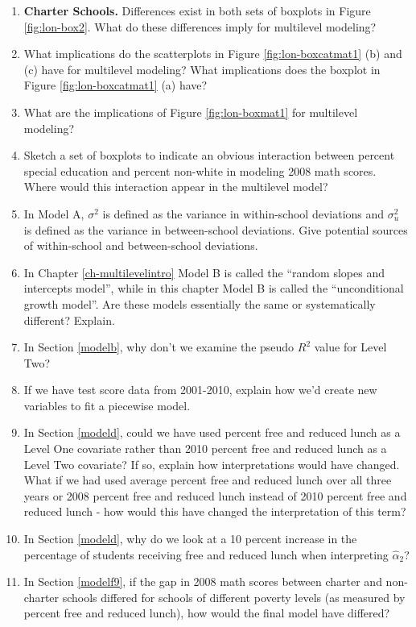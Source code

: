 \documentclass[
]{krantz}
\begin{document}
\begin{enumerate}
\def\labelenumi{\arabic{enumi}.}
\setcounter{enumi}{5}
\item
  \textbf{Charter Schools.} Differences exist in both sets of boxplots in Figure \ref{fig:lon-box2}. What do these differences imply for multilevel modeling?
\item
  What implications do the scatterplots in Figure \ref{fig:lon-boxcatmat1} (b) and (c) have for multilevel modeling? What implications does the boxplot in Figure \ref{fig:lon-boxcatmat1} (a) have?
\item
  What are the implications of Figure \ref{fig:lon-boxmat1} for multilevel modeling?
\item
  Sketch a set of boxplots to indicate an obvious interaction between percent special education and percent non-white in modeling 2008 math scores. Where would this interaction appear in the multilevel model?
\item
  In Model A, \(\sigma^2\) is defined as the variance in within-school deviations and \(\sigma^2_u\) is defined as the variance in between-school deviations. Give potential sources of within-school and between-school deviations.
\item
  In Chapter \ref{ch-multilevelintro} Model B is called the ``random slopes and intercepts model'', while in this chapter Model B is called the ``unconditional growth model''. Are these models essentially the same or systematically different? Explain.
\item
  In Section \ref{modelb}, why don't we examine the pseudo \(R^2\) value for Level Two?
\item
  If we have test score data from 2001-2010, explain how we'd create new variables to fit a piecewise model.
\item
  In Section \ref{modeld}, could we have used percent free and reduced lunch as a Level One covariate rather than 2010 percent free and reduced lunch as a Level Two covariate? If so, explain how interpretations would have changed. What if we had used average percent free and reduced lunch over all three years or 2008 percent free and reduced lunch instead of 2010 percent free and reduced lunch - how would this have changed the interpretation of this term?
\item
  In Section \ref{modeld}, why do we look at a 10 percent increase in the percentage of students receiving free and reduced lunch when interpreting \(\hat{\alpha}_{2}\)?
\item
  In Section \ref{modelf9}, if the gap in 2008 math scores between charter and non-charter schools differed for schools of different poverty levels (as measured by percent free and reduced lunch), how would the final model have differed?

\end{enumerate}
\end{document}
